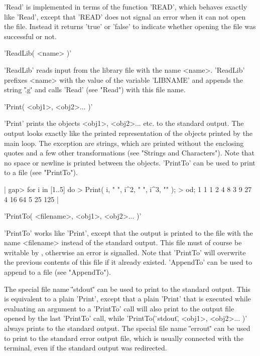 'Read'  is implemented  in  terms of the  function 'READ', which  behaves
exactly like 'Read', except that 'READ' does not signal an  error when it
can not open  the file.  Instead it returns 'true' or 'false' to indicate
whether opening the file was successful or not.

%
%

'ReadLib( <name> )'

'ReadLib'  reads   input from  the  library  file  with  the name <name>.
'ReadLib' prefixes  <name> with the value of  the variable  'LIBNAME' and
appends the string '\".g\"' and calls 'Read'  (see "Read") with this file
name.

%

'Print( <obj1>, <obj2>... )'

'Print' prints the objects <obj1>, <obj2>... etc. to the standard output.
The output looks exactly like  the printed  representation of the objects
printed by the main loop.  The exception are strings,  which are  printed
without  the enclosing  quotes  and  a  few  other  transformations  (see
"Strings  and Characters").   Note that  no  space  or newline is printed
between  the  objects.  'PrintTo'  can  be used  to print to a  file (see
"PrintTo").

|    gap> for i  in [1..5]  do
    >     Print( i, " ", i^2, " ", i^3, "\n" );
    > od;
    1 1 1
    2 4 8
    3 9 27
    4 16 64
    5 25 125 |

%
%

'PrintTo( <filename>, <obj1>, <obj2>... )'

'PrintTo' works  like  'Print', except that  the output is printed to the
file with the name <filename> instead of the  standard output.  This file
must of  course be writable by {\GAP},  otherwise  an error is signalled.
Note that 'PrintTo' will overwrite the previous contents  of this file if
it  already existed.  'AppendTo' can be used  to append  to  a file  (see
"AppendTo").

The  special  file  name  '\"\*stdout\*\"' can  be  used to print  to the
standard output.   This is equivalent to a  plain 'Print', except  that a
plain  'Print'  that is  executed  while   evaluating an argument    to a
'PrintTo' call will  also  print to  the output  file opened by  the last
'PrintTo'  call,  while  'PrintTo(  \"\*stdout\*\", <obj1>,  <obj2>... )'
always   prints to     the standard output.    The  special   file   name
'\"\*errout\*\"' can be used to print to the standard error  output file,
which is usually connected with the terminal, even if the standard output
was redirected.

